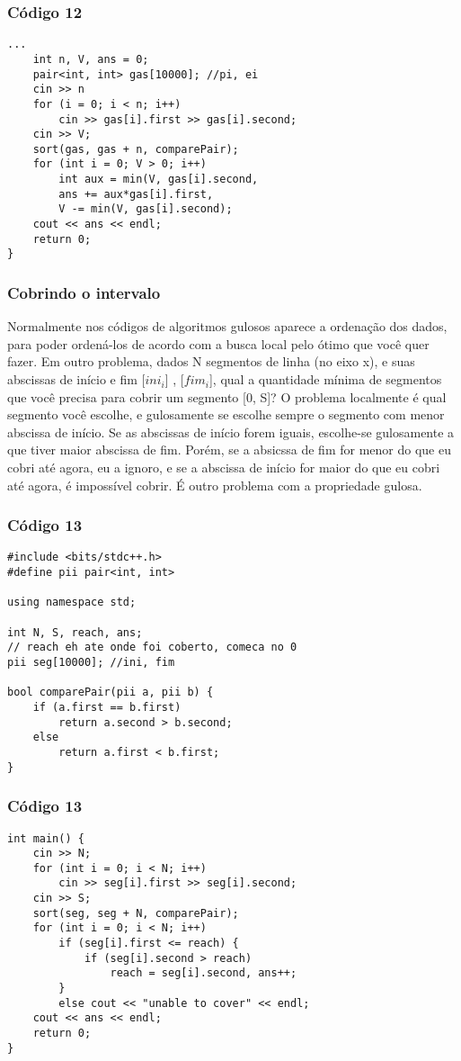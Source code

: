\documentclass{beamer}
\begin{document}
	\begin{frame}[fragile]
	\frametitle{Código 12}
		\begin{lstlisting}
...
    int n, V, ans = 0;
    pair<int, int> gas[10000]; //pi, ei
    cin >> n
    for (i = 0; i < n; i++)
        cin >> gas[i].first >> gas[i].second;
    cin >> V;
    sort(gas, gas + n, comparePair);
    for (int i = 0; V > 0; i++)
        int aux = min(V, gas[i].second,
        ans += aux*gas[i].first,
        V -= min(V, gas[i].second);
    cout << ans << endl;
    return 0;
}
		\end{lstlisting}
	\end{frame}

	\begin{frame}
	\frametitle{Cobrindo o intervalo}
		Normalmente nos códigos de algoritmos gulosos aparece a
		ordenação dos dados, para poder ordená-los de acordo com a
		busca local pelo ótimo que você quer fazer. Em outro problema,
		dados N segmentos de linha (no eixo x), e suas abscissas de
		início e fim [$ini_i$] , [$fim_i$], qual a quantidade mínima de segmentos
		que você precisa para cobrir um segmento [0, S]? O problema
		localmente é qual segmento você escolhe, e gulosamente se
		escolhe sempre o segmento com menor abscissa de início. Se as
		abscissas de início forem iguais, escolhe-se gulosamente a que
		tiver maior abscissa de fim. Porém, se a absicssa de fim for
		menor do que eu cobri até agora, eu a ignoro, e se a abscissa de
		início for maior do que eu cobri até agora, é impossível cobrir. É
		outro problema com a propriedade gulosa.
	\end{frame}

	\begin{frame}[fragile]
	\frametitle{Código 13}
		\begin{lstlisting}
#include <bits/stdc++.h>
#define pii pair<int, int>

using namespace std;

int N, S, reach, ans;
// reach eh ate onde foi coberto, comeca no 0
pii seg[10000]; //ini, fim

bool comparePair(pii a, pii b) {
    if (a.first == b.first)
        return a.second > b.second;
    else
        return a.first < b.first;
}
		\end{lstlisting}
	\end{frame}

	\begin{frame}[fragile]
	\frametitle{Código 13}
		\begin{lstlisting}
int main() {
    cin >> N;
    for (int i = 0; i < N; i++)
        cin >> seg[i].first >> seg[i].second;
    cin >> S;
    sort(seg, seg + N, comparePair);
    for (int i = 0; i < N; i++)
        if (seg[i].first <= reach) {
            if (seg[i].second > reach)
                reach = seg[i].second, ans++;
        }
        else cout << "unable to cover" << endl;
    cout << ans << endl;
    return 0;
}
		\end{lstlisting}
	\end{frame}
\end{document}
